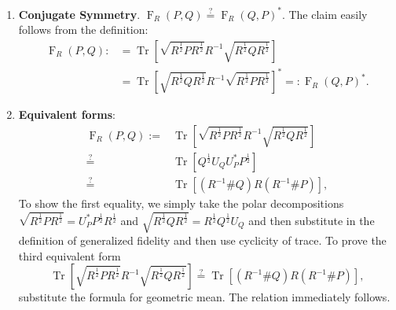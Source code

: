 \documentclass[12pt]{article}
\theoremstyle{definition}
\newcommand{\iseq}{\overset{?}{=}}
\begin{document}
\begin{enumerate}[noitemsep, left=0pt]
    \item \textbf{Conjugate Symmetry}. $\operatorname{F}_R(P,Q) \iseq \operatorname{F}_R(Q,P)^*$. The claim easily follows from the definition:
    \begin{equation}
    \begin{aligned}
              \operatorname {F}_R(P,Q) :&=  \operatorname{Tr}\left[\sqrt{ R^{\frac12} P R^{\frac12}} R^{-1}\sqrt{ R^{\frac12} Q R^{\frac12}}  \right] \\ &= \operatorname{Tr}\left[\sqrt{ R^{\frac12} Q R^{\frac12}} R^{-1}\sqrt{ R^{\frac12} P R^{\frac12}}  \right]^* =: \operatorname{F}_R(Q,P)^*.  
    \end{aligned} 
    \end{equation}
    \item \textbf{Equivalent forms}:
    \begin{equation}
    \begin{aligned}
            \operatorname{F}_R(P,Q) := &\operatorname{Tr}\left[\sqrt{ R^{\frac12} P R^{\frac12}} R^{-1}\sqrt{ R^{\frac12} Q R^{\frac12}}  \right] \\ 
            \iseq  &\operatorname{Tr}\left[ Q ^{\frac12} U_Q U_P^* P^{\frac12}   \right] \\
            \iseq &\operatorname{Tr}\left[(R ^{-1} \# Q) R (R ^{-1} \# P)\right],
    \end{aligned}
    \end{equation}
    To show the first equality, we simply take the polar decompositions $\sqrt{R ^{\frac12} P R ^{\frac12} } = U_P^* P^{\frac12}  R ^{\frac12} $ and $\sqrt{R ^{\frac12} Q R^{\frac12} } = R ^{\frac12} Q ^{\frac12} U_Q$ and then substitute in the definition of generalized fidelity and then use cyclicity of trace. To prove the third equivalent form
    \begin{equation}
            \operatorname{Tr}\left[\sqrt{ R^{\frac12} P R^{\frac12}} R^{-1}\sqrt{ R^{\frac12} Q R^{\frac12}}  \right] \iseq \operatorname{Tr}\left[(R ^{-1} \# Q) R (R ^{-1} \# P)\right],
    \end{equation}
    substitute the formula for geometric mean. The relation immediately follows.


\end{enumerate}
\end{document}
